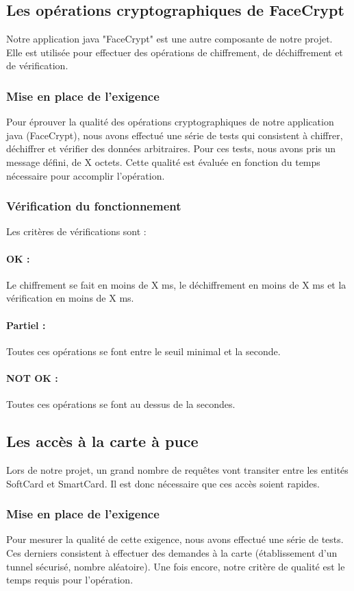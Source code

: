 \documentclass[a4paper,11pt,french]{article}
\begin{document}
\subsection{Les opérations cryptographiques de FaceCrypt}
	Notre application java "FaceCrypt" est une autre composante de notre
projet. Elle est utilisée pour effectuer des opérations de chiffrement, de
déchiffrement et de vérification.
\subsubsection{Mise en place de l'exigence}
	Pour éprouver la qualité des opérations cryptographiques de notre
application java (FaceCrypt), nous avons effectué une série de tests qui
consistent à chiffrer, déchiffrer et vérifier des données arbitraires. Pour
ces tests, nous avons pris un message défini, de X octets. Cette qualité est
évaluée en fonction du temps nécessaire pour accomplir l'opération.

\subsubsection{Vérification du fonctionnement}
	Les critères de vérifications sont :
\paragraph{OK : } Le chiffrement se fait en moins de X ms, le déchiffrement
en moins de X ms et la vérification en moins de X ms.
\paragraph{Partiel : } Toutes ces opérations se font entre le seuil
minimal et la seconde.
\paragraph{NOT OK : } Toutes ces opérations se font au dessus de la
secondes.



\subsection{Les accès à la carte à puce}
	Lors de notre projet, un grand nombre de requêtes vont transiter
entre les entités SoftCard et SmartCard. Il est donc nécessaire que ces
accès soient rapides.
\subsubsection{Mise en place de l'exigence}
	Pour mesurer la qualité de cette exigence, nous avons effectué une
série de tests. Ces derniers consistent à effectuer des demandes à la carte
(établissement d'un tunnel sécurisé, nombre aléatoire). Une fois encore,
notre critère de qualité est le temps requis pour l'opération.
\end{document}
